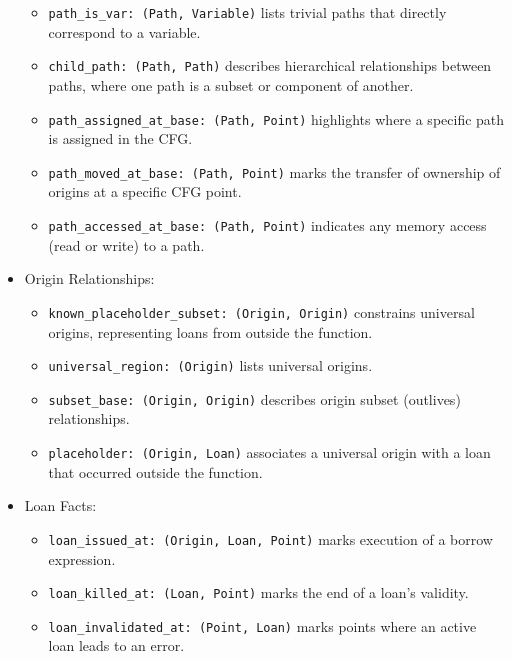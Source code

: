 \documentclass[
  11pt,
  twoside]{report}
\providecommand{\tightlist}{%
  \setlength{\itemsep}{0pt}\setlength{\parskip}{0pt}}
\begin{document}
\begin{itemize}
  \begin{itemize}
  \tightlist
  \item
    \texttt{path\_is\_var:\ (Path,\ Variable)} lists trivial paths that
    directly correspond to a variable.
  \item
    \texttt{child\_path:\ (Path,\ Path)} describes hierarchical
    relationships between paths, where one path is a subset or component
    of another.
  \item
    \texttt{path\_assigned\_at\_base:\ (Path,\ Point)} highlights where
    a specific path is assigned in the CFG.
  \item
    \texttt{path\_moved\_at\_base:\ (Path,\ Point)} marks the transfer
    of ownership of origins at a specific CFG point.
  \item
    \texttt{path\_accessed\_at\_base:\ (Path,\ Point)} indicates any
    memory access (read or write) to a path.
  \end{itemize}
\item
  Origin Relationships:

  \begin{itemize}
  \tightlist
  \item
    \texttt{known\_placeholder\_subset:\ (Origin,\ Origin)} constrains
    universal origins, representing loans from outside the function.
  \item
    \texttt{universal\_region:\ (Origin)} lists universal origins.
  \item
    \texttt{subset\_base:\ (Origin,\ Origin)} describes origin subset
    (outlives) relationships.
  \item
    \texttt{placeholder:\ (Origin,\ Loan)} associates a universal origin
    with a loan that occurred outside the function.
  \end{itemize}
\item
  Loan Facts:

  \begin{itemize}
  \tightlist
  \item
    \texttt{loan\_issued\_at:\ (Origin,\ Loan,\ Point)} marks execution
    of a borrow expression.
  \item
    \texttt{loan\_killed\_at:\ (Loan,\ Point)} marks the end of a loan's
    validity.
  \item
    \texttt{loan\_invalidated\_at:\ (Point,\ Loan)} marks points where
    an active loan leads to an error.
  \end{itemize}
\end{itemize}
\end{document}
